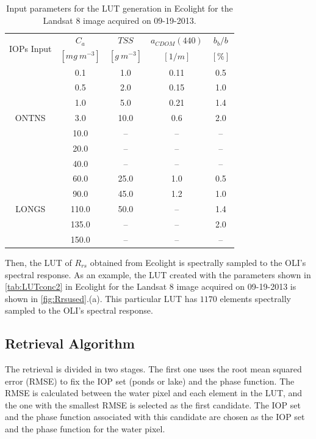 \documentclass[onecolumn,3p,letterpaper]{elsarticle}
\begin{document}
\begin{table}[htb]
\caption{Input parameters for the LUT generation in Ecolight for the Landsat 8 image acquired on 09-19-2013. \label{tab:LUTconc2}} 
\small
\centering
    \begin{tabular}{ccccc}
    \hline \hline
    \multirow{2}{*}{IOPs Input} & \bfseries{$C_a$}    & \bfseries{$TSS$}  & \bfseries{$a_{CDOM}(440)$} & \bfseries{$b_b/b$}\\
               & $[mg~m^{-3}]$      & $[g~m^{-3}]$      &   $[1/m]$                  &  $[\%]$           \\ \hline \hline
\multirow{7}{*}{ONTNS} & 0.1   & 1.0  &  0.11 &  0.5 \\
                       & 0.5   & 2.0  &  0.15 &  1.0 \\
                       & 1.0   & 5.0  &  0.21 &  1.4 \\
                       & 3.0   & 10.0 &  0.6  &  2.0 \\
                       & 10.0  & --   &  --   &  --  \\
                       & 20.0  & --   &  --   &  --  \\
                       & 40.0  & --   &  --   &  --  \\ \hline

\multirow{5}{*}{LONGS} & 60.0  & 25.0 & 1.0   &  0.5 \\  
                       & 90.0  & 45.0 & 1.2   &  1.0 \\  
                       & 110.0 & 50.0 & --    &  1.4 \\  
                       & 135.0 & --   & --    &  2.0 \\  
                       & 150.0 & --   & --    &  --  \\  \hline \hline    
    \end{tabular}
	\end{table}

Then, the LUT of $R_{rs}$ obtained from Ecolight is spectrally sampled to the OLI's spectral response. As an example, the LUT created with the parameters shown in \autoref{tab:LUTconc2} in Ecolight for the Landsat 8 image acquired on 09-19-2013 is shown in \autoref{fig:Rrsused}.(a). This particular LUT has $1170$ elements spectrally sampled to the OLI's spectral response.

\subsection{Retrieval Algorithm} 
\label{subsec:Retrieval}
The retrieval is divided in two stages. The first one uses the root mean squared error (RMSE) to fix the IOP set (ponds or lake) and the phase function. The RMSE is calculated between the water pixel and each element in the LUT, and the one with the smallest RMSE is selected as the first candidate. The IOP set and the phase function associated with this candidate are chosen as the IOP set and the phase function for the water pixel.
\end{document}
